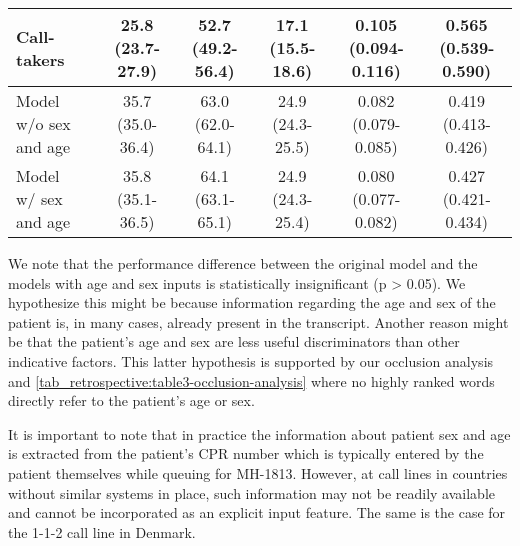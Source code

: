 {\begin{table}
{\begin{tabular}{l|ccccc}
        Call-takers                             & \makecell[c]{25.8 \\ (23.7-27.9)} & \makecell[c]{52.7 \\ (49.2-56.4)} & \makecell[c]{17.1 \\ (15.5-18.6)} & \makecell[c]{0.105 \\ (0.094-0.116)} & \makecell[c]{0.565 \\ (0.539-0.590)} \\
        \midrule
        \makecell[l]{Model \\ w/o sex and age}  & \makecell[c]{35.7 \\ (35.0-36.4)} & \makecell[c]{63.0 \\ (62.0-64.1)} & \makecell[c]{24.9 \\ (24.3-25.5)} & \makecell[c]{0.082 \\ (0.079-0.085)} & \makecell[c]{0.419 \\ (0.413-0.426)} \\
        \midrule
        \makecell[l]{Model \\ w/ sex and age}   & \makecell[c]{35.8 \\ (35.1-36.5)} & \makecell[c]{64.1 \\ (63.1-65.1)} & \makecell[c]{24.9 \\ (24.3-25.4)} & \makecell[c]{0.080 \\ (0.077-0.082)} & \makecell[c]{0.427 \\ (0.421-0.434)} \\
 
        \bottomrule
    \end{tabular}%
    }
\end{table}

We note that the performance difference between the original model and the models with age and sex inputs is statistically insignificant (p > 0.05). We hypothesize this might be because information regarding the age and sex of the patient is, in many cases, already present in the transcript. Another reason might be that the patient's age and sex are less useful discriminators than other indicative factors. This latter hypothesis is supported by our occlusion analysis and \cref{tab_retrospective:table3-occlusion-analysis} where no highly ranked words directly refer to the patient's age or sex.

It is important to note that in practice the information about patient sex and age is extracted from the patient's CPR number which is typically entered by the patient themselves while queuing for MH-1813. However, at call lines in countries without similar systems in place, such information may not be readily available and cannot be incorporated as an explicit input feature. The same is the case for the 1-1-2 call line in Denmark.


}
